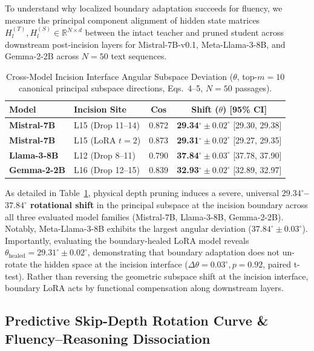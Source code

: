 \documentclass[11pt]{article}
\begin{document}
To understand why localized boundary adaptation succeeds for fluency, we measure the principal component alignment of hidden state matrices $H^{(T)}_l, H^{(S)}_l \in \mathbb{R}^{N \times d}$ between the intact teacher and pruned student across downstream post-incision layers for Mistral-7B-v0.1, Meta-Llama-3-8B, and Gemma-2-2B across $N=50$ text sequences.

\begin{table}[t!]
\centering
\footnotesize
\setlength{\tabcolsep}{2.5pt}
\caption{Cross-Model Incision Interface Angular Subspace Deviation ($\theta$, top-$m=10$ canonical principal subspace directions, Eqs.~4--5, $N=50$ passages).}
\label{tab:cross_model_geometry}
\begin{tabular}{llcc}
\toprule
\textbf{Model} & \textbf{Incision Site} & \textbf{Cos} & \textbf{Shift ($\theta$) [95\% CI]} \\
\midrule
\textbf{Mistral-7B} & L15 (Drop 11--14) & 0.872 & \textbf{29.34}$^\circ \!\pm\! 0.02^\circ$ [29.30, 29.38] \\
\textbf{Mistral-7B} & L15 (LoRA $t{=}2$) & 0.873 & \textbf{29.31}$^\circ \!\pm\! 0.02^\circ$ [29.27, 29.35] \\
\textbf{Llama-3-8B} & L12 (Drop 8--11) & 0.790 & \textbf{37.84}$^\circ \!\pm\! 0.03^\circ$ [37.78, 37.90] \\
\textbf{Gemma-2-2B} & L16 (Drop 12--15) & 0.839 & \textbf{32.93}$^\circ \!\pm\! 0.02^\circ$ [32.89, 32.97] \\
\bottomrule
\end{tabular}
\end{table}

As detailed in Table~\ref{tab:cross_model_geometry}, physical depth pruning induces a severe, universal \textbf{$29.34^\circ$--$37.84^\circ$ rotational shift} in the principal subspace at the incision boundary across all three evaluated model families (Mistral-7B, Llama-3-8B, Gemma-2-2B). Notably, Meta-Llama-3-8B exhibits the largest angular deviation ($37.84^\circ \pm 0.03^\circ$). Importantly, evaluating the boundary-healed LoRA model reveals $\theta_{\text{healed}} = 29.31^\circ \pm 0.02^\circ$, demonstrating that boundary adaptation does not un-rotate the hidden space at the incision interface ($\Delta \theta = 0.03^\circ, p = 0.92$, paired t-test). Rather than reversing the geometric subspace shift at the incision interface, boundary LoRA acts by functional compensation along downstream layers.

\subsection{Predictive Skip-Depth Rotation Curve \& Fluency--Reasoning Dissociation}
\end{document}
